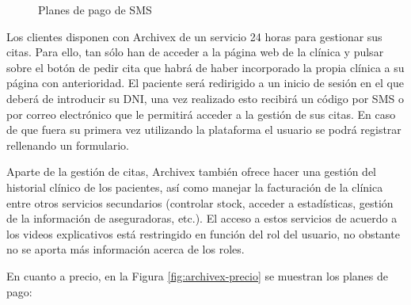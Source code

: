 \begin{figure}[H]
    \caption{Planes de pago de SMS}
    \label{fig:archivex-sms}
\end{figure}

Los clientes disponen con Archivex de un servicio 24 horas para gestionar sus citas. Para ello, tan sólo han de acceder a la página web de la clínica y pulsar sobre el botón de pedir cita que habrá de haber incorporado la propia clínica a su página con anterioridad. El paciente será redirigido a un inicio de sesión en el que deberá de introducir su DNI, una vez realizado esto recibirá un código por SMS o por correo electrónico que le permitirá acceder a la gestión de sus citas. En caso de que fuera su primera vez utilizando la plataforma el usuario se podrá registrar rellenando un formulario. \bigskip

Aparte de la gestión de citas, Archivex también ofrece hacer una gestión del historial clínico de los pacientes, así como manejar la facturación de la clínica entre otros servicios secundarios (controlar stock, acceder a estadísticas, gestión de la información de aseguradoras, etc.). El acceso a estos servicios de acuerdo a los videos explicativos está restringido en función del rol del usuario, no obstante no se aporta más información acerca de los roles. \bigskip

En cuanto a precio, en la Figura \ref{fig:archivex-precio} se muestran los planes de pago:

